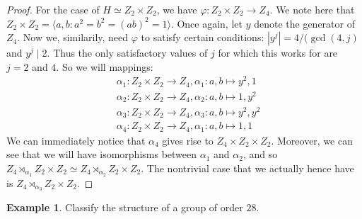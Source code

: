 \documentclass[9pt,reqno]{amsart}
\theoremstyle{definition}
\newtheorem{ex}{Example}[section]
\begin{document}
\begin{proof}
	For the case of $H \simeq Z_2 \times Z_2$, we have $\varphi \colon Z_2 \times Z_2 \to Z_4$. We note here that $Z_2 \times Z_2 = \langle a, b \colon a^2 = b^2 = (ab)^2 = 1 \rangle$. Once again, let $y$ denote the generator of $Z_4$. Now we, similarily, need $\varphi$ to satisfy certain conditions: $|y^j| = 4/(\gcd (4, j)$ and $y^j \mid 2$. Thus the only satisfactory values of $j$ for which this works for are $j = 2$ and $4$. So we will mappings: 
	\begin{align*}
		& \alpha_1 \colon Z_2 \times Z_2 \to Z_4, \alpha_1 \colon a,b  \mapsto y^2, 1 \\
		& \alpha_2 \colon Z_2 \times Z_2 \to Z_4, \alpha_2 \colon a,b  \mapsto 1, y^2 \\
		& \alpha_3 \colon Z_2 \times Z_2 \to Z_4, \alpha_3 \colon a,b  \mapsto y^2, y^2 \\
		& \alpha_4 \colon Z_2 \times Z_2 \to Z_4, \alpha_1 \colon a,b  \mapsto 1, 1 
	\end{align*}
	We can immediately notice that $\alpha_4$ gives rise to $Z_4 \times Z_2 \times Z_2$. Moreover, we can see that we will have isomorphisms between $\alpha_1$ and $\alpha_2$, and so $Z_4 \rtimes_{\alpha_1} Z_2 \times Z_2 \simeq Z_4 \rtimes_{\alpha_2} Z_2 \times Z_2$. The nontrivial case that we actually hence have is $Z_4 \rtimes_{\alpha_3} Z_2 \times Z_2$.
\end{proof}

\begin{ex}
Classify the structure of a group of order $28$.	
\end{ex}
\end{document}
